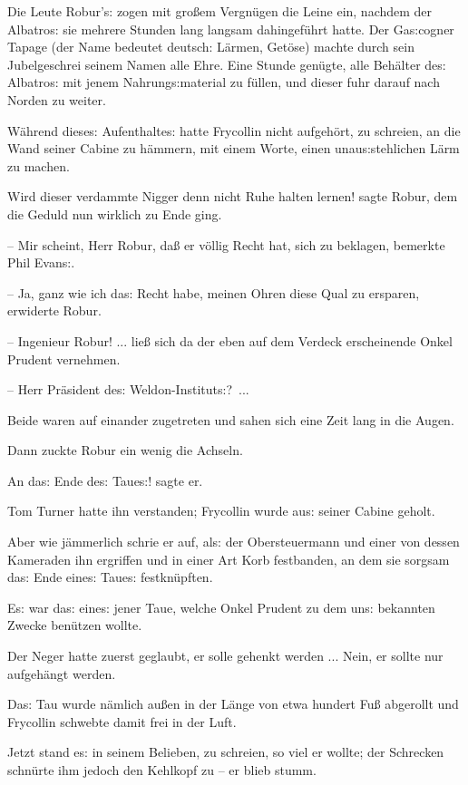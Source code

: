 \documentclass[oneside,12pt]{book}
\newcommand{\s}{s:}
\begin{document}
Die Leute Robur'{\s} zogen mit gro{\ss}em Vergn\"ugen die Leine ein,
nachdem der {\glqq}Albatro{\s}{\grqq} sie mehrere Stunden lang
langsam dahingef\"uhrt hatte. Der Ga{\s}cogner Tapage (der Name
bedeutet deutsch: L\"armen, Get\"ose) machte durch sein Jubelgeschrei
seinem Namen alle Ehre. Eine Stunde gen\"ugte, alle Beh\"alter de{\s}
{\glqq}Albatro{\s}{\grqq} mit jenem Nahrung{\s}material zu f\"ullen,
und dieser fuhr darauf nach Norden zu weiter.

W\"ahrend diese{\s} Aufenthalte{\s} hatte Frycollin nicht
aufgeh\"ort, zu schreien, an die Wand seiner Cabine zu h\"ammern, mit
einem Worte, einen unau{\s}stehlichen L\"arm zu machen.

{\glqq}Wird dieser verdammte Nigger denn nicht Ruhe halten lernen!
sagte Robur, dem die Geduld nun wirklich zu Ende ging.

-- Mir scheint, Herr Robur, da{\ss} er v\"ollig Recht hat, sich zu
beklagen, bemerkte Phil Evan{\s}.

-- Ja, ganz wie ich da{\s} Recht habe, meinen Ohren diese Qual zu
ersparen, erwiderte Robur.

-- Ingenieur Robur! ... lie{\ss} sich da der eben auf dem Verdeck
erscheinende Onkel Prudent vernehmen.

-- Herr Pr\"asident de{\s} Weldon-Institut{\s}?{\grqq}~...

Beide waren auf einander zugetreten und sahen sich eine Zeit lang in
die Augen.

Dann zuckte Robur ein wenig die Achseln.

{\glqq}An da{\s} Ende de{\s} Taue{\s}!{\grqq} sagte er.

Tom Turner hatte ihn verstanden; Frycollin wurde au{\s} seiner Cabine
geholt.

Aber wie j\"ammerlich schrie er auf, al{\s} der Obersteuermann und
einer von dessen Kameraden ihn ergriffen und in einer Art Korb
festbanden, an dem sie sorgsam da{\s} Ende eine{\s} Taue{\s}
festkn\"upften.

E{\s} war da{\s} eine{\s} jener Taue, welche Onkel Prudent zu dem
un{\s} bekannten Zwecke ben\"utzen wollte.

Der Neger hatte zuerst geglaubt, er solle gehenkt werden ... Nein, er
sollte nur aufgeh\"angt werden.

Da{\s} Tau wurde n\"amlich au{\ss}en in der L\"ange von etwa hundert
Fu{\ss} abgerollt und Frycollin schwebte damit frei in der Luft.

Jetzt stand e{\s} in seinem Belieben, zu schreien, so viel er wollte;
der Schrecken schn\"urte ihm jedoch den Kehlkopf zu -- er blieb
stumm.
\end{document}
